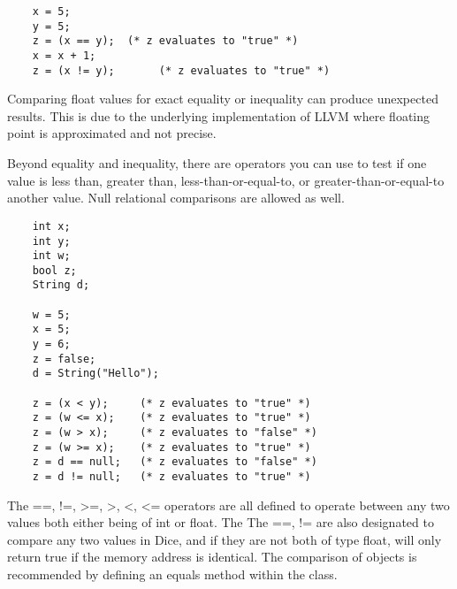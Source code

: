 \begin{homeworkProblem}
\begin{verbatim}
	x = 5;
	y = 5;
	z = (x == y);  (* z evaluates to "true" *)
	x = x + 1;
	z = (x != y);       (* z evaluates to "true" *)
	\end{verbatim}

	Comparing float values for exact equality or inequality can produce unexpected results. This is due to the underlying implementation of LLVM where floating point is approximated and not precise. 
	
	Beyond equality and inequality, there are operators you can use to test if one value is less than, greater than, less-than-or-equal-to, or greater-than-or-equal-to another value. Null relational comparisons are allowed as well. 
	
	\begin{verbatim}
	int x;
	int y;
	int w;
	bool z;
	String d;

	w = 5;
	x = 5;
	y = 6;
	z = false;
	d = String("Hello");
	
	z = (x < y);     (* z evaluates to "true" *)
	z = (w <= x);    (* z evaluates to "true" *)
	z = (w > x);     (* z evaluates to "false" *)
	z = (w >= x);    (* z evaluates to "true" *)
	z = d == null;   (* z evaluates to "false" *)
	z = d != null;   (* z evaluates to "true" *)
	\end{verbatim}
	
	The ==, !=, \textgreater=, \textgreater, \textless, \textless= operators are all defined to operate between any two values both either being of int or float. The The ==, != are also designated to compare any two values in Dice, and if they are not both of type float, will only return true if the memory address is identical. The comparison of objects is recommended by defining an equals method within the class. 


\end{homeworkProblem}
